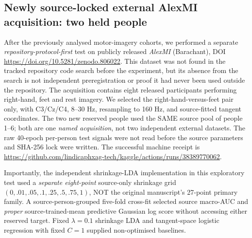 \subsection{Newly source-locked external AlexMI acquisition: two held people}
\label{sec:p1-alexmi-lock}
After the previously analysed motor-imagery cohorts, we
performed a separate \emph{repository-protocol-first} test
on publicly released \emph{AlexMI} (Barachant),
DOI \url{https://doi.org/10.5281/zenodo.806022}.
This dataset was not found in the tracked repository
code search before the experiment, but its absence from
the search is not independent preregistration or proof
it had never been used outside the repository.
The acquisition contains eight released participants
performing right-hand, feet and rest imagery.
We selected the right-hand-versus-feet pair only,
with C3/Cz/C4, 8--30 Hz, resampling to 160 Hz,
and source-fitted tangent coordinates.
The two new reserved people used the SAME
source pool of people 1--6; both are one
\emph{named acquisition}, not two independent
external datasets. The raw 40-epoch per-person
test signals were not read before the source
parameters and SHA-256 lock were written.
The successful machine receipt is
\url{https://github.com/lindicaphxag-tech/kaggle/actions/runs/38389770062}.

Importantly, the independent shrinkage-LDA
implementation in this exploratory test used a
\emph{separate eight-point} source-only shrinkage
grid $(0,.01,.05,.1,.25,.5,.75,1)$, NOT the
original manuscript's 27-point primary family.
A source-person-grouped five-fold cross-fit
selected source macro-AUC and \emph{proper}
source-trained-mean predictive Gaussian
log score without accessing either reserved
target. Fixed $\lambda=0.1$ shrinkage LDA
and tangent-space logistic regression with
fixed $C=1$ supplied non-optimised baselines.

